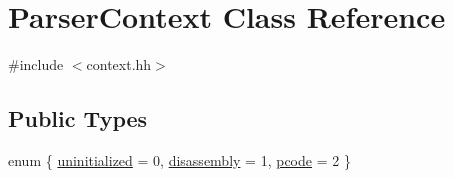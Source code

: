 \hypertarget{class_parser_context}{}\section{Parser\+Context Class Reference}
\label{class_parser_context}


{\ttfamily \#include $<$context.\+hh$>$}

\subsection*{Public Types}
\begin{DoxyCompactItemize}
\item 
enum \{ \mbox{\hyperlink{class_parser_context_aa80b0aff260390f32fc1950107de8b00a441c5ab572992494ae677aad16b91295}{uninitialized}} = 0, 
\mbox{\hyperlink{class_parser_context_aa80b0aff260390f32fc1950107de8b00ac48cd50415fffd34fba3afcb66e5ecca}{disassembly}} = 1, 
\mbox{\hyperlink{class_parser_context_aa80b0aff260390f32fc1950107de8b00ad49caf3f9d467ba77037b4d6c3a47517}{pcode}} = 2
 \}
\end{DoxyCompactItemize}
